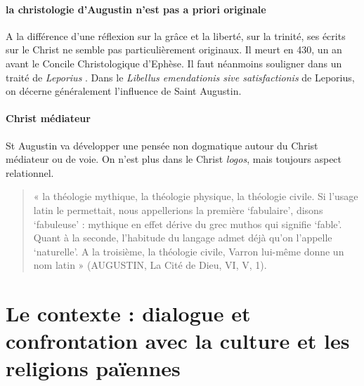 \paragraph{la christologie d'Augustin n'est pas a priori originale} A la différence d'une réflexion sur la grâce et la liberté, sur la trinité, ses écrits sur le Christ ne semble pas particulièrement originaux. Il meurt en 430, un an avant le Concile Christologique d'Ephèse. Il faut néanmoins souligner dans un traité de \textit{Leporius} . Dans le \emph{Libellus emendationis sive satisfactionis} de Leporius, on décerne généralement l'influence de Saint Augustin. 

\paragraph{Christ médiateur} St Augustin va développer une pensée non dogmatique autour du Christ médiateur ou de voie. On n'est plus dans le Christ \textit{logos}, mais toujours aspect relationnel.




\begin{quote}
    « la théologie mythique, la théologie physique, la théologie civile. Si l’usage latin le permettait, nous appellerions la première ‘fabulaire’, disons ‘fabuleuse’ : mythique en effet dérive du grec muthos qui signifie ‘fable’. Quant à la seconde, l’habitude du langage admet déjà qu’on l’appelle ‘naturelle’.  A la troisième, la théologie civile, Varron lui-même donne un nom latin » (AUGUSTIN, La Cité de Dieu, VI, V, 1).  
\end{quote}



 


\section{Le contexte : dialogue et confrontation avec la culture et les religions païennes }

